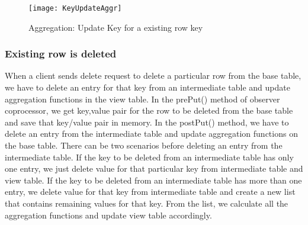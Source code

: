 \documentclass[11pt,a4paper,bibtotoc,idxtotoc,headsepline,footsepline,footexclude,BCOR12mm,DIV13]{scrbook}
\begin{document}

\begin{figure}
    \centering
    \texttt{[image: KeyUpdateAggr]}
    \caption{Aggregation: Update Key for a existing row key}
    \label{sec:updateKeyforexistingrow}
    
\end{figure} 

\newpage
\subsubsection{Existing row is deleted}
\label{subsubsec:rowdelete}
When a client sends delete request to delete a particular row from the base table, we have to delete an entry for that key from an intermediate table and update aggregation functions in the view table. In the prePut() method of observer coprocessor, we get key,value pair for the row to be deleted from the base table and save that key/value pair in memory. In the postPut() method, we have to delete an entry from the intermediate table and update aggregation functions on the base table. There can be two scenarios before deleting an entry from the intermediate table. If the key to be deleted from an intermediate table has only one entry, we just delete value for that particular key from intermediate table and view table. If the key to be deleted from an intermediate table has more than one entry, we delete value for that key from intermediate table and create a new list that contains remaining values for that key. From the list, we calculate all the aggregation functions and update view table accordingly.
\end{document}
